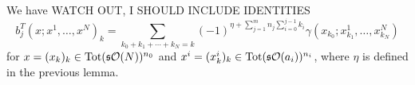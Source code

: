 \documentclass[twoside]{article}
\begin{document}
\begin{lem}
We have WATCH OUT, I SHOULD INCLUDE IDENTITIES
\begin{equation}\label{bracetot}
b_j^T(x;x^1,\dots, x^N)_k=\sum_{k_0+k_1+\cdots+k_N=k}(-1)^{\eta+\sum_{j=1}^m n_j\sum_{i=0}^{j-1}k_i}\gamma(x_{k_0};x^1_{k_1},\dots, x^N_{k_N})
\end{equation}
for $x=(x_k)_k\in\mathrm{Tot}(\mathfrak{s}{\mathcal O}(N))^{n_0}$ and $x^i=(x^i_k)_k\in\mathrm{Tot}(\mathfrak{s}{\mathcal O}(a_i))^{n_i}$, where $\eta$ is defined in the previous lemma. 
\end{lem}
%
%
\end{document}
